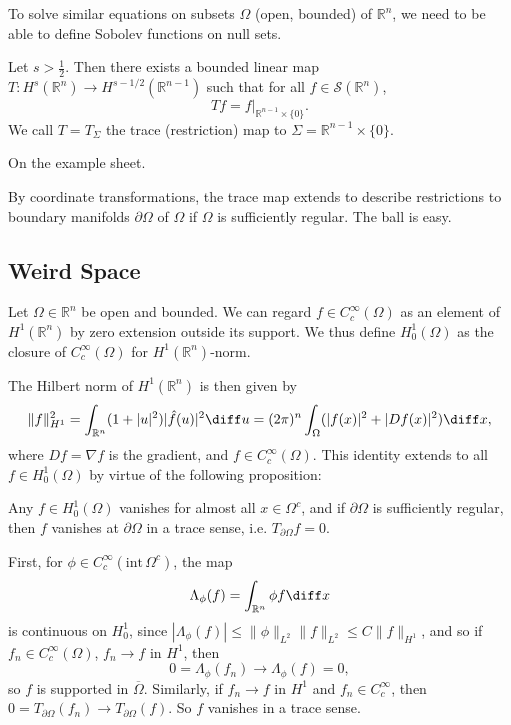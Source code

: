 \documentclass[12pt]{article}
\begin{document}
To solve similar equations on subsets $\Omega$ (open, bounded) of $\mathbb{R}^n$, we need to be able to define Sobolev functions on null sets.

\begin{theorem}
	Let $s > \frac{1}{2}$. Then there exists a bounded linear map $T : H^s(\mathbb{R}^n) \to H^{s - 1/2}(\mathbb{R}^{n-1})$ such that for all $f \in \mathcal{S}(\mathbb{R}^n)$,
	\[
		Tf = f|_{\mathbb{R}^{n-1} \times \{0\}}.
	\]
	We call $T = T_\Sigma$ the trace (restriction) map to $\Sigma = \mathbb{R}^{n-1} \times \{0\}$.
\end{theorem}

\begin{proofbox}
	On the example sheet.
\end{proofbox}

\begin{remark}
	By coordinate transformations, the trace map extends to describe restrictions to boundary manifolds $\partial \Omega$ of $\Omega$ if $\Omega$ is sufficiently regular. The ball is easy.
\end{remark}

\subsection{Weird Space}
\label{sub:ws}

Let $\Omega \in \mathbb{R}^n$ be open and bounded. We can regard $f \in C^\infty_c(\Omega)$ as an element of $H^1(\mathbb{R}^n)$ by zero extension outside its support. We thus define $H^1_0(\Omega)$ as the closure of $C^\infty_c(\Omega)$ for $H^1(\mathbb{R}^n)$-norm.

The Hilbert norm of $H^1(\mathbb{R}^n)$ is then given by
\[
\|f\|_{H^1}^2 = \int_{\mathbb{R}^n}(1 + |u|^2) |\hat f(u)|^2 \diff u = (2 \pi)^n \int_\Omega (|f(x)|^2 + |Df(x)|^2) \diff x,
\]
where $Df = \nabla f$ is the gradient, and $f \in C^\infty_c(\Omega)$. This identity extends to all $f \in H^1_0(\Omega)$ by virtue of the following proposition:

\begin{proposition}
	Any $f \in H^1_0(\Omega)$ vanishes for almost all $x \in \Omega^{c}$, and if $\partial \Omega$ is sufficiently regular, then $f$ vanishes at $\partial \Omega$ in a trace sense, i.e. $T_{\partial \Omega}f = 0$.
\end{proposition}

\begin{proofbox}
	First, for $\phi \in C^\infty_c(\mathrm{int} \, \Omega^{c})$, the map
	\[
	\Lambda_\phi(f) = \int_{\mathbb{R}^n} \phi f \diff x
	\]
	is continuous on $H^1_0$, since $|\Lambda_\phi(f)| \leq \|\phi\|_{L^2} \|f\|_{L^2} \leq C \|f\|_{H^1}$, and so if $f_n \in C^\infty_c(\Omega)$, $f_n \to f$ in $H^1$, then
	\[
	0 = \Lambda_\phi(f_n) \to \Lambda_\phi(f) = 0,
	\]
	so $f$ is supported in $\overline{\Omega}$. Similarly, if $f_n \to f$ in $H^1$ and $f_n \in C^\infty_c$, then $0 = T_{\partial \Omega} (f_n) \to T_{\partial \Omega}(f)$. So $f$ vanishes in a trace sense.
\end{proofbox}
\end{document}

